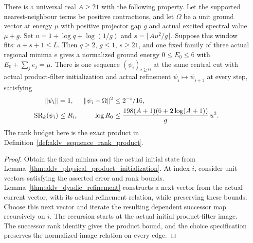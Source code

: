 \begin{lemma}
    \label{thm:aklv_coherent_changing_targets}
    \leanok
    There is a universal real $A\ge21$ with the following property.
    Let the supported nearest-neighbour terms be positive contractions, and
    let $\Omega$ be a unit ground vector at energy $\mu$ with positive
    projector gap $g$ and actual excited spectral value $\mu+g$.
    Set $u=1+\log q+\log(1/g)$ and $s=\lceil Au^2/g\rceil$.
    Suppose this window fits: $a+s+1\le L$.
    Then $q\ge2$, $g\le1$, $s\ge21$, and one fixed family of three
    actual regional minima $e$ gives a normalized ground energy
    $0\le E_0\le6$ with $E_0+\sum_j e_j=\mu$.
    There is one sequence $(\psi_i)_{i\ge0}$ at the same central cut with
    actual product-filter initialization and actual refinement
    $\psi_i\mapsto\psi_{i+1}$ at every step, satisfying
    \begin{align*}
        \|\psi_i\|                  & =1,                                       & \|\psi_i-\Omega\|^2 & \le2^{-i}/16,\notag \\
        \operatorname{SR}_k(\psi_i) & \le R_i,                                  &
        \log R_0                    & \le\frac{198(A+1)(6+2\log(A+1))}{g}\,u^3.
    \end{align*}
    The rank budget here is the exact product in
    Definition~\ref{def:aklv_sequence_rank_product}.
\end{lemma}
\begin{proof}
    \leanok
    Obtain the fixed minima and the actual initial state from
    Lemma~\ref{thm:aklv_physical_product_initialization}.
    At index $i$, consider unit vectors satisfying the asserted error and
    rank bounds. Lemma~\ref{thm:aklv_dyadic_refinement} constructs a next
    vector from the actual current vector, with its actual refinement
    relation, while preserving these bounds. Choose this next vector and
    iterate the resulting dependent successor map recursively on $i$.
    The recursion starts at the actual initial product-filter image.
    The successor rank identity gives the product bound, and the choice
    specification preserves the normalized-image relation on every edge.
\end{proof}
